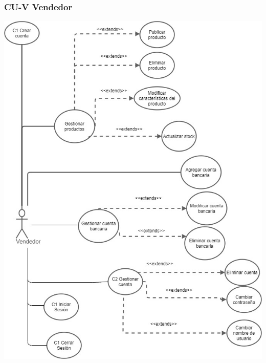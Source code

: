 \documentclass[14pt]{article}
\begin{document}
            \subsubsection{CU-V Vendedor}
            \vspace{0.5cm}
            \includegraphics[height=1.25\textwidth]{CasoDeUsoVendedor.jpg}
            \label{fig:CasoDeUsoVendedor}
                
\end{document}
